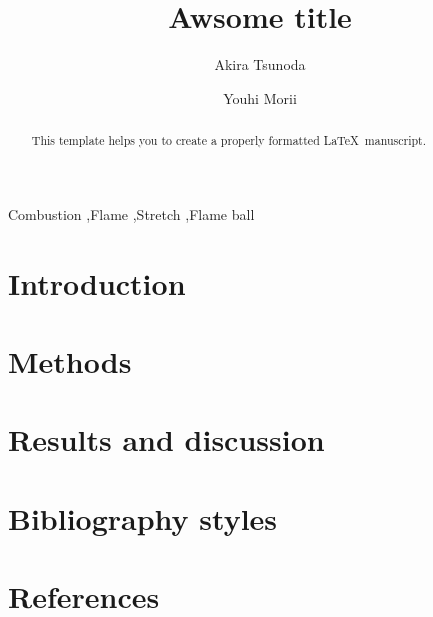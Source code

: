 \documentclass[]{elsarticle}
\begin{document}
\begin{frontmatter}

\title{Awsome title}

\author[IFS, SoE]{Akira Tsunoda}

\author[IFS]{Youhi Morii}

\address[IFS]{Institue of Fluid Science, Tohoku University,\\ 2-1-1 Katahira, Aoba-ku, Sendai, Miyagi, 9808577 Japan}
\address[SoE]{School of Engineering, Tohoku University,\\ 6-6 Aoba, Aramaki, Aoba-ku, Sendai, Miyagi, 9808579 Japan}

\begin{abstract}
This template helps you to create a properly formatted \LaTeX\ manuscript.
\end{abstract}

\begin{keyword}
Combustion \sep Flame \sep Stretch \sep Flame ball
\end{keyword}

\end{frontmatter}

\linenumbers
\twocolumn

\section{Introduction}

\section{Methods}

\section{Results and discussion}

\section{Bibliography styles}

\section*{References}

%
\end{document}
